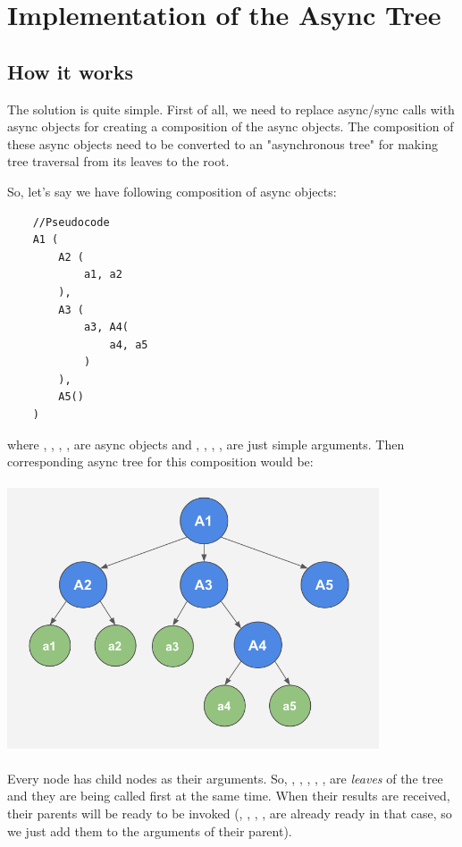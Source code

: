 \documentclass{article}
\begin{document}
\section{Implementation of the Async Tree}

\subsection{How it works}

The solution is quite simple. First of all, we need to replace async/sync calls with async objects for creating a composition of the async objects. The composition of these async objects need to be converted to an "asynchronous tree" for making tree traversal from its leaves to the root.

So, let's say we have following composition of async objects:

\begin{verbatim}
    //Pseudocode
    A1 (
        A2 (
            a1, a2
        ),
        A3 (
            a3, A4(
                a4, a5
            )
        ),
        A5()
    )
\end{verbatim}
where , , , ,  are async objects and , , , ,  are just simple arguments. Then corresponding async tree for this composition would be:

\vspace*{10px}
\includegraphics[width=11cm, height=8cm]{async-tree.png}

\newpage
Every node has child nodes as their arguments. So, , , , , ,  are \textit{leaves} of the tree and they are being called first at the same time. When their results are received, their parents will be ready to be invoked (, , , ,  are already ready in that case, so we just add them to the arguments of their parent).
\end{document}
